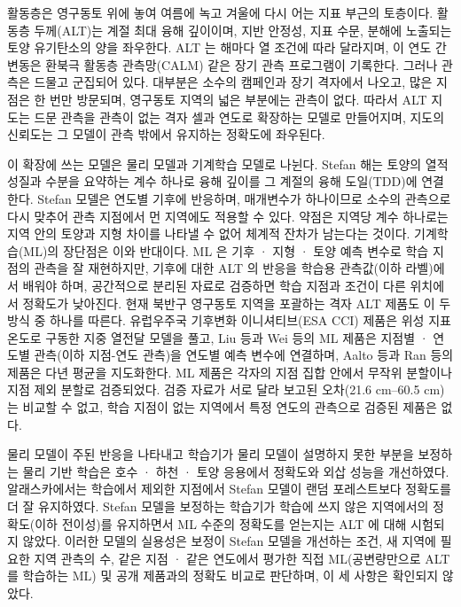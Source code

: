 활동층은 영구동토 위에 놓여 여름에 녹고 겨울에 다시 어는 지표 부근의 토층이다. 활동층 두께(ALT)는 계절 최대 융해 깊이이며, 지반 안정성, 지표 수문, 분해에 노출되는 토양 유기탄소의 양을 좌우한다\cite{Hjort2018,Schuur2015,Biskaborn2019}. ALT 는 해마다 열 조건에 따라 달라지며, 이 연도 간 변동은 환북극 활동층 관측망(CALM) 같은 장기 관측 프로그램이 기록한다\cite{Nelson1997,Streletskiy2025}. 그러나 관측은 드물고 군집되어 있다. 대부분은 소수의 캠페인과 장기 격자에서 나오고, 많은 지점은 한 번만 방문되며, 영구동토 지역의 넓은 부분에는 관측이 없다\cite{Moore2025,Veremeeva2025}. 따라서 ALT 지도는 드문 관측을 관측이 없는 격자 셀과 연도로 확장하는 모델로 만들어지며, 지도의 신뢰도는 그 모델이 관측 밖에서 유지하는 정확도에 좌우된다.

이 확장에 쓰는 모델은 물리 모델과 기계학습 모델로 나뉜다. Stefan 해는 토양의 열적 성질과 수분을 요약하는 계수 하나로 융해 깊이를 그 계절의 융해 도일(TDD)에 연결한다\cite{Stefan1891,Riseborough2008,Nelson1997}. Stefan 모델은 연도별 기후에 반응하며, 매개변수가 하나이므로 소수의 관측으로 다시 맞추어 관측 지점에서 먼 지역에도 적용할 수 있다. 약점은 지역당 계수 하나로는 지역 안의 토양과 지형 차이를 나타낼 수 없어 체계적 잔차가 남는다는 것이다. 기계학습(ML)의 장단점은 이와 반대이다. ML 은 기후 · 지형 · 토양 예측 변수로 학습 지점의 관측을 잘 재현하지만, 기후에 대한 ALT 의 반응을 학습용 관측값(이하 라벨)에서 배워야 하며, 공간적으로 분리된 자료로 검증하면 학습 지점과 조건이 다른 위치에서 정확도가 낮아진다\cite{Roberts2017,Ploton2020,MeyerPebesma2022,Wadoux2021}. 현재 북반구 영구동토 지역을 포괄하는 격자 ALT 제품도 이 두 방식 중 하나를 따른다. 유럽우주국 기후변화 이니셔티브(ESA CCI) 제품은 위성 지표 온도로 구동한 지중 열전달 모델을 풀고\cite{Westermann2024,Westermann2025}, Liu 등\cite{Liu2024}과 Wei 등\cite{Wei2026}의 ML 제품은 지점별 · 연도별 관측(이하 지점-연도 관측)을 연도별 예측 변수에 연결하며, Aalto 등\cite{Aalto2018}과 Ran 등\cite{Ran2022a}의 제품은 다년 평균을 지도화한다. ML 제품은 각자의 지점 집합 안에서 무작위 분할이나 지점 제외 분할로 검증되었다. 검증 자료가 서로 달라 보고된 오차(21.6 cm\cite{Liu2024}--60.5 cm\cite{Wei2026})는 비교할 수 없고, 학습 지점이 없는 지역에서 특정 연도의 관측으로 검증된 제품은 없다.

물리 모델이 주된 반응을 나타내고 학습기가 물리 모델이 설명하지 못한 부분을 보정하는 물리 기반 학습은 호수 · 하천 · 토양 응용에서 정확도와 외삽 성능을 개선하였다\cite{Willard2022,Read2019,Jia2021}. 알래스카에서는 학습에서 제외한 지점에서 Stefan 모델이 랜덤 포레스트보다 정확도를 더 잘 유지하였다\cite{Gautam2025}. Stefan 모델을 보정하는 학습기가 학습에 쓰지 않은 지역에서의 정확도(이하 전이성)를 유지하면서 ML 수준의 정확도를 얻는지는 ALT 에 대해 시험되지 않았다. 이러한 모델의 실용성은 보정이 Stefan 모델을 개선하는 조건, 새 지역에 필요한 지역 관측의 수, 같은 지점 · 같은 연도에서 평가한 직접 ML(공변량만으로 ALT 를 학습하는 ML) 및 공개 제품과의 정확도 비교로 판단하며, 이 세 사항은 확인되지 않았다.

